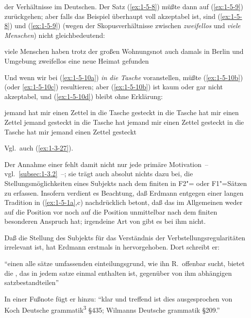 \documentclass[output=paper]{langsci/langscibook}
\begin{document}
der Verhältnisse im Deutschen. Der Satz (\ref{ex:1-5-8}) müßte dann auf (\ref{ex:1-5-9}) zurückgehen; aber
falls das Beispiel überhaupt voll akzeptabel ist, sind (\ref{ex:1-5-8}) und (\ref{ex:1-5-9}) (wegen der Skopusverhältnisse zwischen \textit{zweifellos} und \textit{viele Menschen}) nicht gleichbedeutend:
\begin{exe}
\ex\label{ex:1-5-9}
viele Menschen haben trotz der großen Wohnungsnot auch damals in Berlin
und Umgebung zweifellos eine neue Heimat gefunden
\end{exe}
Und wenn wir bei (\ref{ex:1-5-10a}) \textit{in die Tasche} voranstellen, müßte (\ref{ex:1-5-10b}) (oder \ref{ex:1-5-10c}) resultieren; aber (\ref{ex:1-5-10b}) ist kaum oder gar nicht akzeptabel, und (\ref{ex:1-5-10d}) bleibt ohne Erklärung:
\begin{exe}
\ex\label{ex:1-5-10}
\begin{xlist}
\ex\label{ex:1-5-10a} jemand hat mir einen Zettel in die Tasche gesteckt
\ex\label{ex:1-5-10b} in die Tasche hat mir einen Zettel jemand gesteckt
\ex\label{ex:1-5-10c} in die Tasche hat jemand mir einen Zettel gesteckt
\ex\label{ex:1-5-10d} in die Tasche hat mir jemand einen Zettel gesteckt
\end{xlist}
\end{exe}
Vgl.\ auch (\ref{ex:1-3-27}).

Der Annahme einer  fehlt damit nicht nur jede primäre Motivation~-- vgl.\ \ref{subsec:1-3.2}~--; sie trägt auch absolut nichts dazu bei, die Stellungsmöglichkeiten
eines Subjekts nach dem finiten  in F2"= oder F1"=Sätzen zu erfassen. Insofern verdient es Beachtung, daß Erdmann entgegen einer langen Tradition in (\ref{ex:1-5-1a},c) nachdrücklich betont, daß das  im Allgemeinen weder auf die Position vor noch auf die Position unmittelbar nach dem finiten  besonderen Anspruch hat; irgendeine Art
von  gibt es bei ihm nicht.


Daß die Stellung des Subjekts für das Verständnis der Verbstellungsregularitäten
irrelevant ist, hat Erdmann erstmals in \citet{Erdmann1881} hervorgehoben. Dort schreibt er:
\begin{exe}
\ex\label{ex:1-5-11}
"`einen alle sätze umfassenden einteilungsgrund, wie ihn R.\ offenbar sucht,
bietet die , das in jedem satze einmal enthalten ist,
gegenüber  von ihm abhängigen satzbestandteilen"' \citep[192]{Erdmann1881}
\end{exe}
In einer Fußnote fügt er hinzu: "`klar und treffend ist dies ausgesprochen von Koch
Deutsche grammatik\textsuperscript{3} §435; Wilmanns Deutsche grammatik §209."' \citep[192 Fn.\,1]{Erdmann1881}
\end{document}
